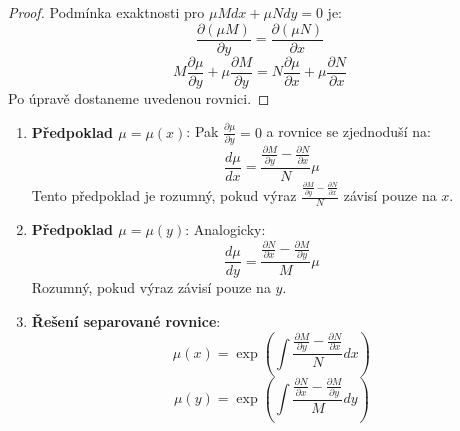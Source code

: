\vspace{0.4\baselineskip}

\begin{proof}
Podmínka exaktnosti pro $\mu M dx + \mu N dy = 0$ je:
\[
\frac{\partial (\mu M)}{\partial y} = \frac{\partial (\mu N)}{\partial x}
\]
\[
M\frac{\partial \mu}{\partial y} + \mu\frac{\partial M}{\partial y} = N\frac{\partial \mu}{\partial x} + \mu\frac{\partial N}{\partial x}
\]
Po úpravě dostaneme uvedenou rovnici.
\end{proof}

\vspace{0.8\baselineskip}

\begin{method}
\label{met:integracni-faktory-speciální}
\begin{enumerate}
\item \textbf{Předpoklad $\mu = \mu(x)$}: Pak $\frac{\partial \mu}{\partial y} = 0$ a rovnice se zjednoduší na:
\[
\frac{d\mu}{dx} = \frac{\frac{\partial M}{\partial y} - \frac{\partial N}{\partial x}}{N} \mu
\]
Tento předpoklad je rozumný, pokud výraz $\frac{\frac{\partial M}{\partial y} - \frac{\partial N}{\partial x}}{N}$ závisí pouze na $x$.

\item \textbf{Předpoklad $\mu = \mu(y)$}: Analogicky:
\[
\frac{d\mu}{dy} = \frac{\frac{\partial N}{\partial x} - \frac{\partial M}{\partial y}}{M} \mu
\]
Rozumný, pokud výraz závisí pouze na $y$.

\item \textbf{Řešení separované rovnice}:
\[
\mu(x) = \exp\left(\int \frac{\frac{\partial M}{\partial y} - \frac{\partial N}{\partial x}}{N} dx\right)
\]
\[
\mu(y) = \exp\left(\int \frac{\frac{\partial N}{\partial x} - \frac{\partial M}{\partial y}}{M} dy\right)
\]
\end{enumerate}
\end{method}

\vspace{0.8\baselineskip}

